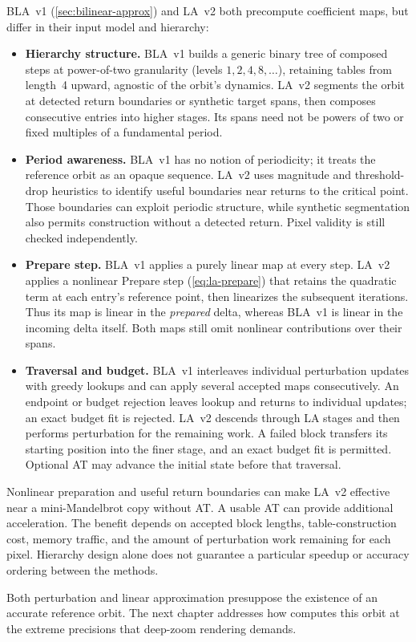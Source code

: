 BLA~v1 (\cref{sec:bilinear-approx}) and LA~v2 both precompute coefficient
maps, but differ in their input model and hierarchy:
\begin{itemize}
  \item \textbf{Hierarchy structure.} BLA~v1 builds a generic binary tree
        of composed steps at power-of-two granularity (levels
        \(1, 2, 4, 8, \ldots\)), retaining tables from length~4
        upward, agnostic of the orbit's dynamics.
        LA~v2 segments the orbit at detected return boundaries or
        synthetic target spans, then composes consecutive entries
        into higher stages. Its spans need not be powers of two or
        fixed multiples of a fundamental period.

  \item \textbf{Period awareness.} BLA~v1 has no notion of periodicity;
        it treats the reference orbit as an opaque sequence.  LA~v2
        uses magnitude and threshold-drop heuristics to identify
        useful boundaries near returns to the critical point. Those
        boundaries can exploit periodic structure, while synthetic
        segmentation also permits construction without a detected
        return. Pixel validity is still checked independently.

  \item \textbf{Prepare step.} BLA~v1 applies a purely linear map at every
        step.  LA~v2 applies a nonlinear Prepare step
        (\cref{eq:la-prepare}) that retains the quadratic term at each
        entry's reference point, then linearizes the subsequent
        iterations. Thus its map is linear in the \emph{prepared}
        delta, whereas BLA~v1 is linear in the incoming delta itself.
        Both maps still omit nonlinear contributions over their spans.

  \item \textbf{Traversal and budget.} BLA~v1 interleaves individual
        perturbation updates with greedy lookups and can apply several
        accepted maps consecutively. An endpoint or budget rejection
        leaves lookup and returns to individual updates; an exact
        budget fit is rejected. LA~v2 descends through LA stages and
        then performs perturbation for the remaining work. A failed
        block transfers its starting position into the finer stage,
        and an exact budget fit is permitted. Optional AT may advance
        the initial state before that traversal.
\end{itemize}
Nonlinear preparation and useful return boundaries can make LA~v2
effective near a mini-Mandelbrot copy without AT. A usable AT can
provide additional acceleration. The benefit depends on accepted block lengths,
table-construction cost, memory traffic, and the amount of perturbation
work remaining for each pixel. Hierarchy design alone does not
guarantee a particular speedup or accuracy ordering between the methods.

Both perturbation and linear approximation presuppose the existence of
an accurate reference orbit.  The next chapter addresses how
\FractalShark{} computes this orbit at the extreme precisions that
deep-zoom rendering demands.
